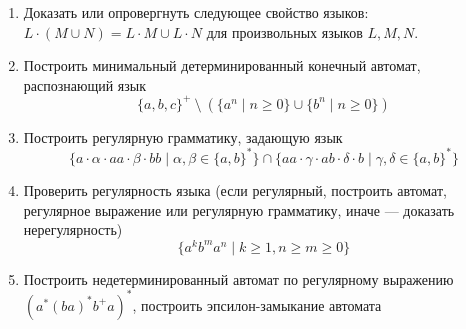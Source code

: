 \documentclass[12pt]{article}
\begin{document}
\begin{enumerate}
  \item Доказать или опровергнуть следующее свойство языков: $ L \cdot (M \cup N) = L \cdot M \cup L \cdot N $ для произвольных языков $L, M, N$.
  
  \item Построить минимальный детерминированный конечный автомат, распознающий язык  \[ \{ a,b,c \}^+ \ \setminus \ ( \{a^n \mid n \geq 0\} \cup \{b^n \mid n \geq 0\})\]
  
  \item Построить регулярную грамматику, задающую язык 
\[\{ a \cdot \alpha \cdot a a \cdot \beta \cdot b b \mid \alpha, \beta \in \{ a, b \}^* \} \cap \{a a \cdot \gamma \cdot a b \cdot \delta \cdot b \mid \gamma, \delta \in \{a, b\}^* \} \]
  \item Проверить регулярность языка (если регулярный, построить автомат, регулярное выражение или регулярную грамматику, иначе --- доказать нерегулярность) 
  \[\{ a^k b^m a^n \mid k \geq 1, n \geq m \geq 0 \}\]
  \item {Построить недетерминированный автомат по регулярному выражению $ (a^* (ba)^* b^+ a)^* $, построить эпсилон-замыкание автомата }
\end{enumerate}
\end{document}
